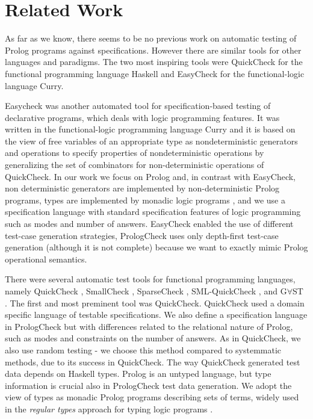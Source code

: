 
\section{Related Work} 
\label{sec:rel-work}

As far as we know, there seems to be no previous work on automatic
testing of Prolog programs against specifications.
%
However there are similar tools for other languages and paradigms.
%
The two most inspiring tools were QuickCheck \cite{...} for the
functional programming language Haskell and EasyCheck \cite{...}  for
the functional-logic language Curry.

Easycheck was another automated tool for specification-based testing of
declarative programs, which deals with logic programming features.
%
It was written in the functional-logic programming language Curry and it
is based on the view of free variables of an appropriate type as
nondeterministic generators \cite{OVERLAPPING RULES AND LOGIC
  VARIABLES...2006} and operations to specify properties of
nondeterministic operations by generalizing the set of combinators for
non-deterministic operations of QuickCheck.
%
In our work we focus on Prolog and, in contrast with EasyCheck, non
deterministic generators are implemented by non-deterministic Prolog
programs, types are implemented by monadic logic programs \cite{Types as
  Logic Programs - Fruewirth, Types as Theories, Florido and Damas}, and
we use a specification language with standard specification features of
logic programming such as modes and number of answers\cite{Yves
  Deville}.
EasyCheck enabled the use of different test-case generation strategies,
PrologCheck uses only depth-first test-case generation (although it is
not complete) because we want to exactly mimic Prolog operational
semantics.


There were several automatic test tools for functional programming
languages, namely QuickCheck \cite{...}, SmallCheck \cite{...},
SparseCheck \cite{...}, SML-QuickCheck \cite{...}, and G$\forall$ST
\cite{...}.
The first and most preminent tool was QuickCheck.
QuickCheck used a domain specific language of testable specifications.
We also define a specification language in PrologCheck but with
differences related to the relational nature of Prolog, such as modes
and constraints on the number of answers.
As in QuickCheck, we also use random testing - we choose this method
compared to systemmatic methods, due to its success in QuickCheck.
The way QuickCheck generated test data depends on Haskell types.
Prolog is an untyped language, but type information is crucial also in
PrologCheck test data generation.
We adopt the view of types as monadic Prolog programs describing sets of
terms, widely used in the  {\em regular types} approach for typing logic
programs \cite{RegularTypes - Yardeni,Shapiro, Logic Programs as Types
  for logic programs - Fruewirth, Types of Logic Programming - J. Zobel,
  Types and Theories - Florido and Damas}.
